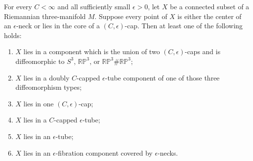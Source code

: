 \begin{theorem}
\label{thm:cap-and-neck-cover-classification}
\notready
For every $C<\infty$ and all sufficiently small $\epsilon>0$, let $X$ be
a connected subset of a Riemannian three-manifold $M$.  Suppose every
point of $X$ is either the center of an $\epsilon$-neck or lies in the core
of a $(C,\epsilon)$-cap.  Then at least one of the following holds:
\begin{enumerate}
\item $X$ lies in a component which is the union of two
      $(C,\epsilon)$-caps and is diffeomorphic to
      $S^3$, $\mathbb{RP}^3$, or
      $\mathbb{RP}^3\#\mathbb{RP}^3$;
\item $X$ lies in a doubly $C$-capped $\epsilon$-tube component of one
      of those three diffeomorphism types;
\item $X$ lies in one $(C,\epsilon)$-cap;
\item $X$ lies in a $C$-capped $\epsilon$-tube;
\item $X$ lies in an $\epsilon$-tube;
\item $X$ lies in an $\epsilon$-fibration component covered by
      $\epsilon$-necks.
\end{enumerate}
\end{theorem}

